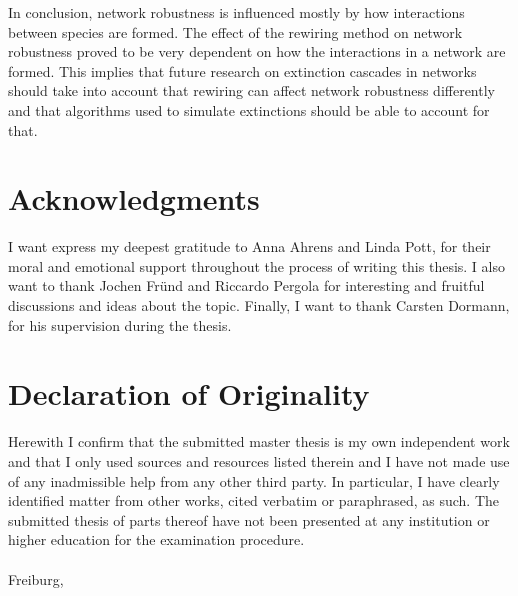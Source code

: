 \documentclass[12pt,a4paper]{article}
\begin{document}
In conclusion, network robustness is influenced mostly by how interactions between species are formed. The effect of the rewiring method on network robustness proved to be very dependent on how the interactions in a network are formed. This implies that future research on extinction cascades in networks should take into account that rewiring can affect network robustness differently and that algorithms used to simulate extinctions should be able to account for that.

\section{Acknowledgments}
I want express my deepest gratitude to Anna Ahrens and Linda Pott, for their moral and emotional support throughout the process of writing this thesis. I also want to thank Jochen Fründ and Riccardo Pergola for interesting and fruitful discussions and ideas about the topic. Finally, I want to thank Carsten Dormann, for his supervision during the thesis.
\newpage
\section*{Declaration of Originality}
Herewith I confirm that the submitted master thesis is my own independent work and that I only used sources and resources listed therein and I have not made use of any inadmissible help from any other third party. In particular, I have clearly identified matter from other works, cited verbatim or paraphrased, as such.
The submitted thesis of parts thereof have not been presented at any institution or higher education for the examination procedure.\paragraph{}

Freiburg,\paragraph{}
\end{document}
